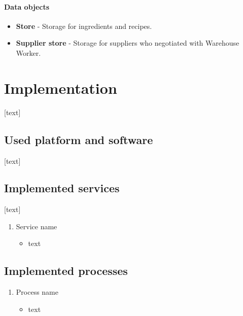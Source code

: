 \documentclass[11pt,a4paper]{article}
\begin{document}
\paragraph{Data objects}

\begin{itemize}
    \item \textbf{Store} - Storage for ingredients and recipes.
    \item \textbf{Supplier store} - Storage for suppliers who negotiated with Warehouse Worker.
\end{itemize}

\newpage



\section{Implementation}

[text]

\subsection{Used platform and software}

[text]

\subsection{Implemented services}

[text]

\begin{enumerate}
    \item Service name
    \begin{itemize}
        \item text
    \end{itemize}
\end{enumerate}

\subsection{Implemented processes}

\begin{enumerate}
    \item Process name
    \begin{itemize}
        \item text
    \end{itemize}
\end{enumerate}
\end{document}

